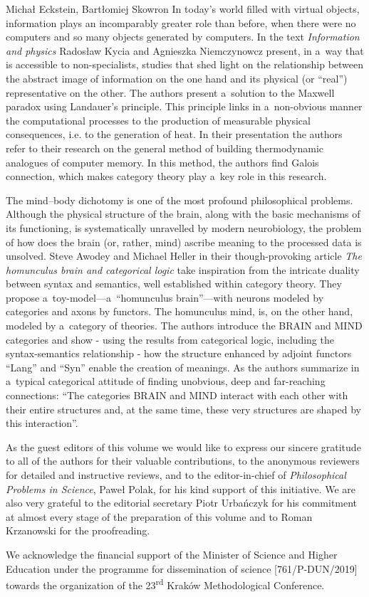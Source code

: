 \begin{editorialeng}{Michał Eckstein, Bartłomiej Skowron}
In today's world filled with virtual objects, information plays an incomparably greater role than before, when there were no computers and so many objects generated by computers. In the text \textit{Information and physics} Radosław Kycia and Agnieszka Niemczynowcz present, in a~way that is accessible to non-specialists, studies that shed light on the relationship between the abstract image of information on the one hand and its physical (or ``real'') representative on the other. The authors present a~solution to the Maxwell paradox using Landauer's principle. This principle links in a~non-obvious manner the computational processes to the production of measurable physical consequences, i.e. to the generation of heat. In their presentation the authors refer to their research on the general method of building thermodynamic analogues of computer memory. In this method, the authors find Galois connection, which makes category theory play a~key role in this research.

The mind–body dichotomy is one of the most profound philosophical problems. Although the physical structure of the brain, along with the basic mechanisms of its functioning, is systematically unravelled by modern neurobiology, the problem of how does the brain (or, rather, mind) ascribe meaning to the processed data is unsolved. Steve Awodey and Michael Heller in their though-provoking article \textit{The homunculus brain and categorical logic} take inspiration from the intricate duality between syntax and semantics, well established within category theory. They propose a~toy-model---a~``homunculus brain''---with neurons modeled by categories and axons by functors. The homunculus mind, is, on the other hand, modeled by a~category of theories. The authors introduce the BRAIN and MIND categories and show - using the results from categorical logic, including the syntax-semantics relationship - how the structure enhanced by adjoint functors ``Lang'' and ``Syn'' enable the creation of meanings. As the authors summarize in a~typical categorical attitude of finding unobvious, deep and far-reaching connections: ``The categories BRAIN and MIND interact with each other with their entire structures and, at the same time, these very structures are shaped by this interaction''.

As the guest editors of this volume we would like to express our sincere gratitude to all of the authors for their valuable contributions, to the anonymous reviewers for detailed and instructive reviews, and to the editor-in-chief of \textit{Philosophical Problems in Science}, Paweł Polak, for his kind support of this initiative. We are also very grateful to the editorial secretary Piotr Urbańczyk for his commitment at almost every stage of the preparation of this volume and to Roman Krzanowski for the proofreading.

We acknowledge the financial support of the Minister of Science and Higher Education under the programme for dissemination of science [761/P-DUN/2019] towards the organization of the 23\textsuperscript{rd} Kraków Methodological Conference.


\end{editorialeng}